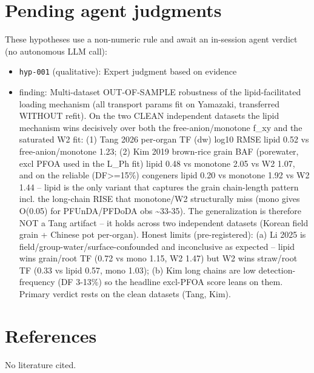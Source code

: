 \documentclass{article}
\begin{document}
\section{Pending agent judgments}
These hypotheses use a non-numeric rule and await an in-session agent verdict (no autonomous LLM call):
\begin{itemize}
  \item \texttt{hyp-001} (qualitative): Expert judgment based on evidence
  \item finding: Multi-dataset OUT-OF-SAMPLE robustness of the lipid-facilitated loading mechanism (all transport params fit on Yamazaki, transferred WITHOUT refit). On the two CLEAN independent datasets the lipid mechanism wins decisively over both the free-anion/monotone f\_xy and the saturated W2 fit: (1) Tang 2026 per-organ TF (dw) log10 RMSE lipid 0.52 vs free-anion/monotone 1.23; (2) Kim 2019 brown-rice grain BAF (porewater, excl PFOA used in the L\_Ph fit) lipid 0.48 vs monotone 2.05 vs W2 1.07, and on the reliable (DF>=15\%) congeners lipid 0.20 vs monotone 1.92 vs W2 1.44 -- lipid is the only variant that captures the grain chain-length pattern incl. the long-chain RISE that monotone/W2 structurally miss (mono gives O(0.05) for PFUnDA/PFDoDA obs \textasciitilde{}33-35). The generalization is therefore NOT a Tang artifact -- it holds across two independent datasets (Korean field grain + Chinese pot per-organ). Honest limits (pre-registered): (a) Li 2025 is field/group-water/surface-confounded and inconclusive as expected -- lipid wins grain/root TF (0.72 vs mono 1.15, W2 1.47) but W2 wins straw/root TF (0.33 vs lipid 0.57, mono 1.03); (b) Kim long chains are low detection-frequency (DF 3-13\%) so the headline excl-PFOA score leans on them. Primary verdict rests on the clean datasets (Tang, Kim).
\end{itemize}

\section{References}
No literature cited.
\end{document}
